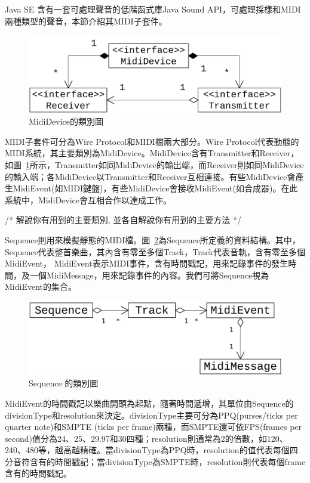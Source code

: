 \documentclass[12pt,a4paper,oneside]{report}
\begin{document}
Java SE 含有一套可處理聲音的低階函式庫Java Sound API，可處理採樣和MIDI兩種類型的聲音，本節介紹其MIDI子套件。

\begin{figure}[htb]
\centering
\includegraphics[scale=0.15]{img/mididevice.png}
\caption{ MidiDevice的類別圖 }
\label{fig:mididevice}
\end{figure}

MIDI子套件可分為Wire Protocol和MIDI檔兩大部分。Wire Protocol代表動態的MIDI系統，其主要類別為MidiDevice。MidiDevice含有Transmitter和Receiver，如圖~\ref{fig:mididevice}所示，Transmitter如同MidiDevice的輸出端，而Receiver則如同MidiDevice的輸入端；各MidiDevice以Transmitter和Receiver互相連接。有些MidiDevice會產生MidiEvent(如MIDI鍵盤)，有些MidiDevice會接收MidiEvent(如合成器)。在此系統中，MidiDevice會互相合作以達成工作。

/*
     解說你有用到的主要類別, 並各自解說你有用到的主要方法
*/




Sequence則用來模擬靜態的MIDI檔。圖~\ref{fig:sequence}為Sequence所定義的資料結構。其中，Sequence代表整首樂曲，其內含有零至多個Track，Track代表音軌，含有零至多個MidiEvent， MidiEvent表示MIDI事件，含有時間戳記，用來記錄事件的發生時間，及一個MidiMessage，用來記錄事件的內容。我們可將Sequence視為MidiEvent的集合。

\begin{figure}[htb]
\centering
\includegraphics[scale=0.15]{img/sequence.png}
\caption{ Sequence 的類別圖 }
\label{fig:sequence}
\end{figure}

MidiEvent的時間戳記以樂曲開頭為起點，隨著時間遞增，其單位由Sequence的divisionType和resolution來決定。divisionType主要可分為PPQ(purses/ticks per quarter note)和SMPTE (ticks per frame)兩種，而SMPTE還可依FPS(frames per second)值分為24、25、29.97和30四種；resolution則通常為2的倍數，如120、240、480等，越高越精確。當divisionType為PPQ時，resolution的值代表每個四分音符含有的時間戳記；當divisionType為SMPTE時，resolution則代表每個frame含有的時間戳記。
\end{document}
